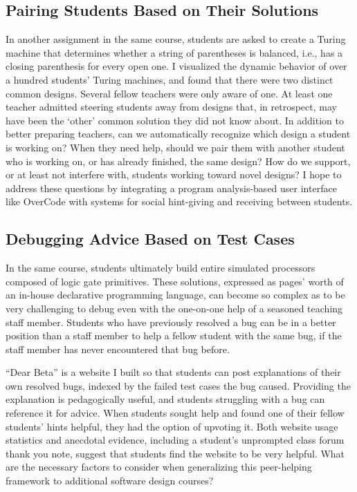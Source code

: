 \documentclass{sigchi}
\begin{document}
\subsection{Pairing Students Based on Their Solutions} In another assignment in the same course, students are asked to create a Turing machine that determines whether a string of parentheses is balanced, i.e., has a closing parenthesis for every open one. I visualized the dynamic behavior of over a hundred students' Turing machines, and found that there were two distinct common designs. Several fellow teachers were only aware of one. At least one teacher admitted steering students away from designs that, in retrospect, may have been the `other' common solution they did not know about. In addition to better preparing teachers, can we automatically recognize which design a student is working on? When they need help, should we pair them with another student who is working on, or has already finished, the same design? How do we support, or at least not interfere with, students working toward novel designs? I hope to address these questions by integrating a program analysis-based user interface like OverCode with systems for social hint-giving and receiving between students.

\subsection{Debugging Advice Based on Test Cases} In the same course, students ultimately build entire simulated processors composed of logic gate primitives. These solutions, expressed as pages' worth of an in-house declarative programming language, can become so complex as to be very challenging to debug even with the one-on-one help of a seasoned teaching staff member. Students who have previously resolved a bug can be in a better position than a staff member to help a fellow student with the same bug, if the staff member has never encountered that bug before. 

``Dear Beta'' is a website I built so that students can post explanations of their own resolved bugs, indexed by the failed test cases the bug caused. Providing the explanation is pedagogically useful, and students struggling with a bug can reference it for advice. When students sought help and found one of their fellow students' hints helpful, they had the option of upvoting it. Both website usage statistics and anecdotal evidence, including a student's unprompted class forum thank you note, suggest that students find the website to be very helpful. What are the necessary factors to consider when generalizing this peer-helping framework to additional software design courses?
\end{document}
